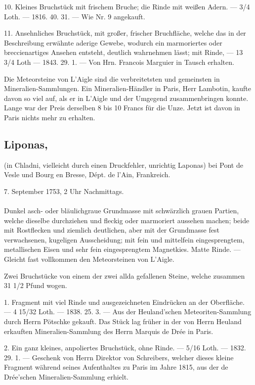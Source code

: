\documentclass[a4paper, 11pt, oneside, polutonikogreek, german]{article}
\begin{document}
10. Kleines Bruchstück mit frischem Bruche; die Rinde mit weißen Adern. — 3/4 Loth. — 1816. 40. 31. — Wie Nr. 9 angekauft.

11. Ansehnliches Bruchstück, mit großer, frischer Bruchfläche, welche das in der Beschreibung erwähnte aderige Gewebe, wodurch ein marmoriertes oder breccienartiges Ansehen entsteht, deutlich wahrnehmen lässt; mit Rinde, — 13 3/4 Loth — 1843. 29. 1. — Von Hrn. Francois Marguier in Tausch erhalten.

Die Meteorsteine von L’Aigle sind die verbreitetsten und gemeinsten in Mineralien-Sammlungen. Ein Mineralien-Händler in Paris, Herr Lambotin, kaufte davon so viel auf, als er in L’Aigle und der Umgegend zusammenbringen konnte. Lange war der Preis derselben 8 bis 10 Francs für die Unze. Jetzt ist davon in Paris nichts mehr zu erhalten.
\subsection[Liponas.]{Liponas,}
\begin{center}
\small
(in Chladni, vielleicht durch einen Druckfehler, unrichtig Laponas) bei Pont de Vesle und Bourg en Bresse, Dépt. de l'Ain, Frankreich.

7. September 1753, 2 Uhr Nachmittags.
\end{center}
\paragraph{}
Dunkel asch- oder bläulichgraue Grundmasse mit schwärzlich grauen Partien, welche dieselbe durchziehen und fleckig oder marmoriert aussehen machen; beide mit Rostflecken und ziemlich deutlichen, aber mit der Grundmasse fest verwachsenen, kugeligen Ausscheidung; mit fein und mittelfein eingesprengtem, metallischen Eisen und sehr fein eingesprengtem Magnetkies. Matte Rinde. — Gleicht fast vollkommen den Meteorsteinen von L'Aigle.

Zwei Bruchstücke von einem der zwei allda gefallenen Steine, welche zusammen 31 1/2 Pfund wogen.

1. Fragment mit viel Rinde und ausgezeichneten Eindrücken an der Oberfläche. — 4 15/32 Loth. — 1838. 25. 3. — Aus der Heuland'schen Meteoriten-Sammlung durch Herrn Pötschke gekauft. Das Stück lag früher in der von Herrn Heuland erkauften Mineralien-Sammlung des Herrn Marquis de Drée in Paris.

2. Ein ganz kleines, anpoliertes Bruchstück, ohne Rinde. — 5/16 Loth. — 1832. 29. 1. — Geschenk von Herrn Direktor von Schreibers, welcher dieses kleine Fragment während seines Aufenthaltes zu Paris im Jahre 1815, aus der de Drée'schen Mineralien-Sammlung erhielt.
\end{document}
